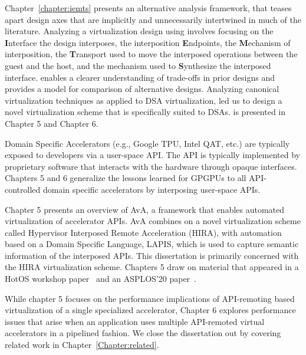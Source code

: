 Chapter~\ref{chapter:iemts} presents an alternative analysis framework, \iemts
that teases apart design axes that are implicitly and unnecessarily intertwined
in much of the literature. Analyzing a virtualization design using \iemts
involves focusing on the \textbf{I}nterface the design interposes, the
interposition \textbf{E}ndpoints, the \textbf{M}echanism of interposition, the
\textbf{T}ransport used to move the interposed operations between the guest
and the host, and the mechanism used to \textbf{S}ynthesize the interposed
interface. \iemts enables a clearer understanding of trade-offs in prior
designs and provides a model for comparison of alternative designs. Analyzing
canonical virtualization techniques as applied to DSA virtualization, led us to
design \hira a novel virtualization scheme that is specifically suited to DSAs.
\hira is presented in Chapter 5 and Chapter 6.

Domain Specific Accelerators (e.g., Google TPU, Intel QAT, etc.) are
typically exposed to developers via a user-space API. The API is typically
implemented by proprietary software that interacts with the hardware through
opaque interfaces. Chapters 5 and 6 generalize the lessons learned for GPGPUs to all API-controlled domain specific accelerators by interposing user-space APIs.

Chapter 5 presents an overview of AvA, a framework that enables automated
virtualization of accelerator APIs. AvA combines on a novel virtualization
scheme called Hypervisor Interposed Remote Acceleration (HIRA), with
automation based on a Domain Specific Language, LAPIS, which is used to
capture semantic information of the interposed APIs. This dissertation is
primarily concerned with the HIRA virtualization scheme.
Chapters 5 draw on material that appeared in a HotOS workshop
paper~\cite{ava-hotos} and an ASPLOS'20 paper~\cite{ava-asplos}.

While chapter 5 focuses on the performance implications of API-remoting based
virtualization of a single specialized accelerator, Chapter 6 explores
performance issues that arise when an application uses multiple API-remoted
virtual accelerators in a pipelined fashion. We close the dissertation out by
covering related work in Chapter~\ref{Chapter:related}.